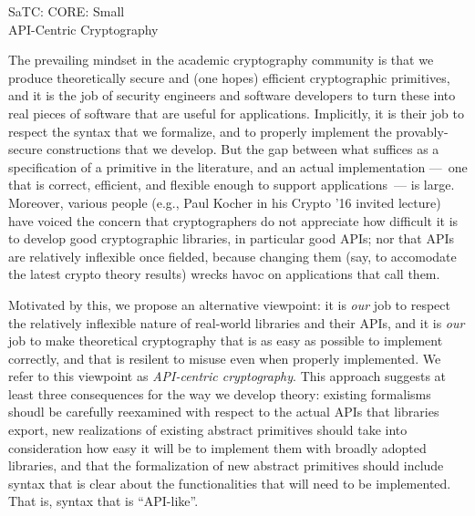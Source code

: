 \documentclass[10pt]{article}
\begin{document}
\thispagestyle{empty}

\begin{center}
{\Large SaTC: CORE: Small }\\ 
{\Large API-Centric Cryptography\\} 
\end{center}

\noindent
The prevailing mindset in the academic cryptography community is that
we produce theoretically secure and (one hopes) efficient
cryptographic primitives, and it is the job of security engineers and
software developers to turn these into real pieces of software that
are useful for applications.  Implicitly, it is their job to respect
the syntax that we formalize, and to properly implement the
provably-secure constructions that we develop.  But
the gap between what suffices as a
specification of a primitive in the literature, and an actual
implementation ---~one that is correct, efficient, and flexible enough
to support applications~--- is large.  Moreover, various 
people (e.g., Paul Kocher in his Crypto '16 invited lecture) have
voiced the concern that cryptographers do not appreciate how
difficult it is to develop good cryptographic libraries, in particular
good APIs; nor that APIs are relatively inflexible once fielded,
because changing them (say, to accomodate the latest crypto theory
results) wrecks havoc on applications that call them.

Motivated by this, we propose an alternative viewpoint: it is
\emph{our} job to respect the relatively inflexible nature of
real-world libraries and their APIs, and it is \emph{our} job to make
theoretical cryptography that is as easy as possible to implement
correctly, and that is resilent to misuse even when properly
implemented.  We refer to this viewpoint as
\emph{API-centric cryptography}.  This approach suggests at least
three consequences for the way we develop theory: existing formalisms
shoudl be carefully reexamined with respect to the actual APIs that
libraries export, new realizations of existing abstract primitives
should take into consideration how easy it will be to implement them
with broadly adopted libraries, and that the formalization of new
abstract primitives should include syntax that is clear about the
functionalities that will need to be implemented.  That is, syntax
that is ``API-like''.
\end{document}
